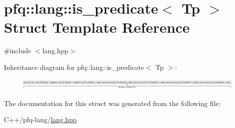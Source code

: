 \hypertarget{structpfq_1_1lang_1_1is__predicate}{\section{pfq\+:\+:lang\+:\+:is\+\_\+predicate$<$ Tp $>$ Struct Template Reference}
\label{structpfq_1_1lang_1_1is__predicate}
}


{\ttfamily \#include $<$lang.\+hpp$>$}

Inheritance diagram for pfq\+:\+:lang\+:\+:is\+\_\+predicate$<$ Tp $>$\+:\begin{figure}[H]
\begin{center}
\leavevmode
\includegraphics[height=0.571137cm]{structpfq_1_1lang_1_1is__predicate}
\end{center}
\end{figure}


The documentation for this struct was generated from the following file\+:\begin{DoxyCompactItemize}
\item 
C++/pfq-\/lang/\hyperlink{lang_8hpp}{lang.\+hpp}\end{DoxyCompactItemize}
